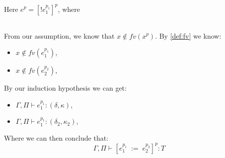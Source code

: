 \item[\runa{T-Ref-write}] Here $e^p=[!e_1^{p_1}]^p$, where
\begin{figure}[H]
	\setlength\tabcolsep{8pt}
	\begin{tabular}{l}
		
	\end{tabular}
\end{figure}

From our assumption, we know that $x\notin fv(x^p)$.
By \cref{def:fv} we know:
\begin{itemize}
	\item $x\notin fv(e_1^{p_1})$,
	\item $x\notin fv(e_2^{p_2})$,
\end{itemize}
By our induction hypothesis we can get:
\begin{itemize}
	\item $\Gamma,\Pi\vdash e_1^{p_1}:(\delta,\kappa)$,
	\item $\Gamma,\Pi\vdash e_1^{p_1}:(\delta_2,\kappa_2)$,
\end{itemize}
Where we can then conclude that:
$$\Gamma,\Pi\vdash [e_1^{p_1}\;:=\;e_2^{p_2}]^{p}:T$$
